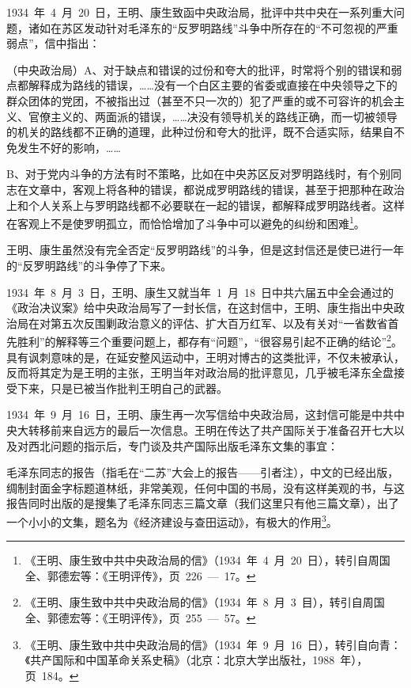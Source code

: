 1934~年~4~月~20~日，王明、康生致函中央政治局，批评中共中央在一系列重大问题，诸如在苏区发动针对毛泽东的“反罗明路线”斗争中所存在的“不可忽视的严重弱点”，信中指出：

\begin{quoting}
（中央政治局）A、对于缺点和错误的过份和夸大的批评，时常将个别的错误和弱点都解释成为路线的错误，……没有一个白区主要的省委或直接在中央领导之下的群众团体的党团，不被指出过（甚至不只一次的）犯了严重的或不可容许的机会主义、官僚主义的、两面派的错误，……决没有领导机关的路线正确，而一切被领导的机关的路线都不正确的道理，此种过份和夸大的批评，既不合适实际，结果自不免发生不好的影响，……

B、对于党内斗争的方法有时不策略，比如在中央苏区反对罗明路线时，有个别同志在文章中，客观上将各种的错误，都说成罗明路线的错误，甚至于把那种在政治上和个人关系上与罗明路线都不必要联在一起的错误，都解释成罗明路线者。这样在客观上不是使罗明孤立，而恰恰增加了斗争中可以避免的纠纷和困难\footnote{《王明、康生致中共中央政治局的信》（1934~年~4~月~20~日），转引自周国全、郭德宏等：《王明评传》，页~226~—~17。}。
\end{quoting}

王明、康生虽然没有完全否定“反罗明路线”的斗争，但是这封信还是使已进行一年的“反罗明路线”的斗争停了下来。

1934~年~8~月~3~日，王明、康生又就当年~1~月~18~日中共六届五中全会通过的《政治决议案》给中央政治局写了一封长信，在这封信中，王明、康生指出中央政治局在对第五次反围剿政治意义的评估、扩大百万红军、以及有关对“一省数省首先胜利”的解释等三个重要问题上，都存有“问题”，“很容易引起不正确的结论”\footnote{《王明、康生致中共中央政治局的信》（1934~年~8~月~3~目），转引自周国全、郭德宏等：《王明评传》，页~255~—~57。}。具有讽刺意味的是，在延安整风运动中，王明对博古的这类批评，不仅未被承认，反而将其定为是王明的主张，王明当年对政治局的批评意见，几乎被毛泽东全盘接受下来，只是已被当作批判王明自己的武器。

1934~年~9~月~16~日，王明、康生再一次写信给中央政治局，这封信可能是中共中央大转移前来自远方的最后一次信息。王明在传达了共产国际关于准备召开七大以及对西北问题的指示后，专门谈及共产国际出版毛泽东文集的事宜：

\begin{quoting}
毛泽东同志的报告（指毛在“二苏”大会上的报告——引者注），中文的已经出版，绸制封面金字标题道林纸，非常美观，任何中国的书局，没有这样美观的书，与这报告同时出版的是搜集了毛泽东同志三篇文章（我们这里只有他三篇文章），出了一个小小的文集，题名为《经济建设与查田运动》，有极大的作用\footnote{《王明、康生致中共中央政治局的信》（1934~年~9~月~16~日），转引自向青：《共产国际和中国革命关系史稿》（北京：北京大学出版社，1988~年），页~184。}。
\end{quoting}

